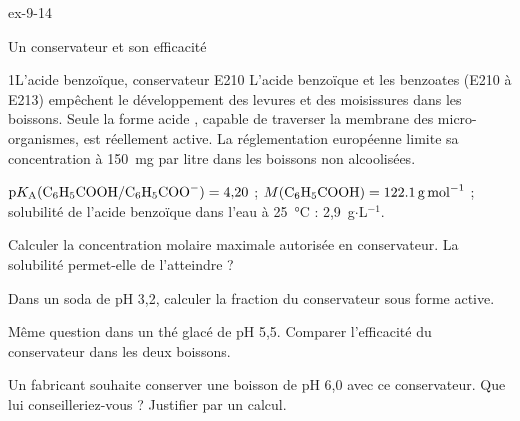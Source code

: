 \begin{blocLivre}{ex-9-14}
\begin{exercice}[3]{Un conservateur et son efficacité}
\begin{docu}{1}{L'acide benzoïque, conservateur E210}
L'acide benzoïque  et les benzoates (E210 à E213) empêchent le développement des levures et des
moisissures dans les boissons. Seule la forme acide , capable de traverser la membrane des
micro-organismes, est réellement active. La réglementation européenne limite sa concentration à 150~mg par litre dans
les boissons non alcoolisées.
\end{docu}
\begin{donnees}
$\pKa(\ce{C6H5COOH}/\ce{C6H5COO-})=4{,}20$ ; $M(\ce{C6H5COOH})=\qty{122,1}{g.mol^{-1}}$ ; solubilité de l'acide
benzoïque dans l'eau à 25~°C : 2,9~g$\cdot$L$^{-1}$.
\end{donnees}
\begin{questions}
\item Calculer la concentration molaire maximale autorisée en conservateur. La solubilité permet-elle de l'atteindre ?
\item Dans un soda de pH 3,2, calculer la fraction du conservateur sous forme active.
\item Même question dans un thé glacé de pH 5,5. Comparer l'efficacité du conservateur dans les deux boissons.
\item \initiative Un fabricant souhaite conserver une boisson de pH 6,0 avec ce conservateur. Que lui
conseilleriez-vous ? Justifier par un calcul.
\end{questions}
\end{exercice}
\end{blocLivre}
